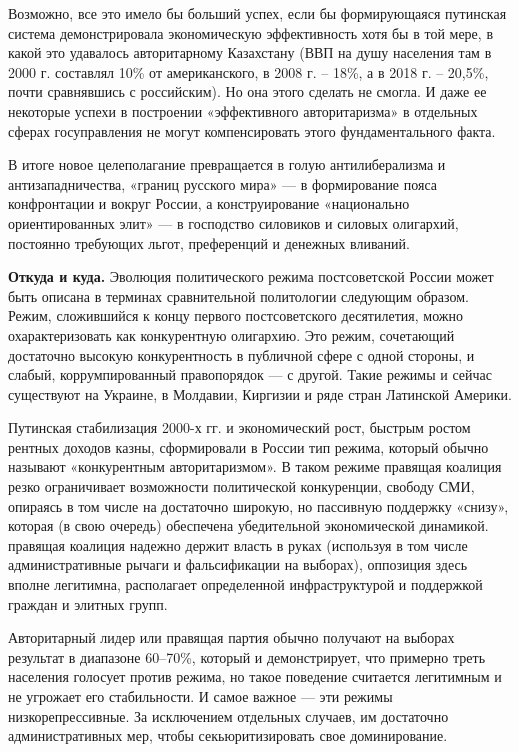 Возможно, все это имело бы больший успех, если бы формирующаяся путинская система демонстрировала экономическую эффективность хотя бы в той мере, в какой это удавалось авторитарному Казахстану (ВВП на душу населения там в 2000 г. составлял 10\% от американского, в 2008 г. – 18\%, а в 2018 г. – 20,5\%, почти сравнявшись с российским). Но она этого сделать не смогла. И даже ее некоторые успехи в построении «эффективного авторитаризма» в отдельных сферах госуправления не могут компенсировать этого фундаментального факта.

В итоге новое целеполагание превращается в голую  антилиберализма и антизападничества,  «границ русского мира» --- в формирование пояса конфронтации и  вокруг России, а конструирование «национально ориентированных элит» --- в  господство силовиков и силовых олигархий, постоянно требующих льгот, преференций и денежных вливаний.

\textbf{Откуда и куда.}
Эволюция политического режима постсоветской России может быть описана в терминах сравнительной политологии следующим образом. Режим, сложившийся к концу первого постсоветского десятилетия, можно охарактеризовать как конкурентную олигархию. Это режим, сочетающий достаточно высокую конкурентность в публичной сфере с одной стороны, и слабый, коррумпированный правопорядок --- с другой. Такие режимы и сейчас существуют на Украине, в Молдавии, Киргизии и ряде стран Латинской Америки.

Путинская стабилизация 2000-х гг. и экономический рост,  быстрым ростом рентных доходов казны, сформировали в России тип режима, который обычно называют «конкурентным авторитаризмом». В таком режиме правящая коалиция резко ограничивает возможности политической конкуренции, свободу СМИ, опираясь в том числе на достаточно широкую, но пассивную поддержку «снизу», которая (в свою очередь) обеспечена убедительной экономической динамикой.  правящая коалиция надежно держит власть в руках (используя в том числе административные рычаги и фальсификации на выборах), оппозиция здесь вполне легитимна, располагает определенной инфраструктурой и поддержкой граждан и элитных групп.

Авторитарный лидер или правящая партия обычно получают на выборах результат в диапазоне 60–70\%, который и демонстрирует, что примерно треть населения голосует против режима, но такое поведение считается легитимным и не угрожает его стабильности. И самое важное --- эти режимы низкорепрессивные. За исключением отдельных случаев, им достаточно административных мер, чтобы секьюритизировать свое доминирование.

